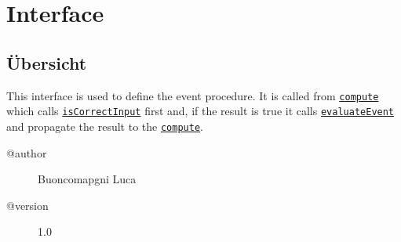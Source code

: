 
\section[OFEventInterface]{Interface }\label{ontologyFramework.OFEventManagement.OFLogicalEventManagement.OFEventInterface-class}
\subsection{Übersicht}
This interface is used to define the event procedure. It is called
 from \texttt{\hyperlink{ontologyFramework.OFEventManagement.OFLogicalEventManagement.OFEventDefinition.compute(ontologyFramework.OFRunning.OFInvokingManager.OFBuildedListInvoker)}{compute}} which calls
 \texttt{\hyperlink{ontologyFramework.OFEventManagement.OFLogicalEventManagement.OFEventInterface.isCorrectInput(java.util.List<ontologyFramework.OFEventManagement.EventComputedData>)}{isCorrectInput}} first and, if the result is true it calls
 \texttt{\hyperlink{ontologyFramework.OFEventManagement.OFLogicalEventManagement.OFEventInterface.evaluateEvent(java.util.List<ontologyFramework.OFEventManagement.EventComputedData>,ontologyFramework.OFRunning.OFInvokingManager.OFBuildedListInvoker)}{evaluateEvent}} and propagate the result
 to the \texttt{\hyperlink{ontologyFramework.OFEventManagement.OFLogicalEventManagement.OFEventAggregation.compute(ontologyFramework.OFRunning.OFInvokingManager.OFBuildedListInvoker)}{compute}}.
\begin{description}
\item[@author] 
Buoncomapgni Luca
\item[@version] 
1.0
\end{description}
